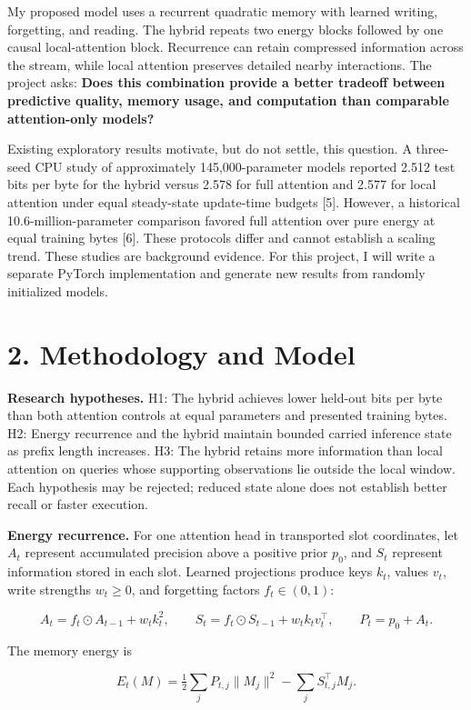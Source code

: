 \documentclass[11pt,letterpaper]{article}
\begin{document}
My proposed model uses a recurrent quadratic memory with learned writing, forgetting, and reading. The hybrid repeats two energy blocks followed by one causal local-attention block. Recurrence can retain compressed information across the stream, while local attention preserves detailed nearby interactions. The project asks: \textbf{Does this combination provide a better tradeoff between predictive quality, memory usage, and computation than comparable attention-only models?}

Existing exploratory results motivate, but do not settle, this question. A three-seed CPU study of approximately 145,000-parameter models reported 2.512 test bits per byte for the hybrid versus 2.578 for full attention and 2.577 for local attention under equal steady-state update-time budgets [5]. However, a historical 10.6-million-parameter comparison favored full attention over pure energy at equal training bytes [6]. These protocols differ and cannot establish a scaling trend. These studies are background evidence. For this project, I will write a separate PyTorch implementation and generate new results from randomly initialized models.

\newpage
\section*{2. Methodology and Model}

\textbf{Research hypotheses.} H1: The hybrid achieves lower held-out bits per byte than both attention controls at equal parameters and presented training bytes. H2: Energy recurrence and the hybrid maintain bounded carried inference state as prefix length increases. H3: The hybrid retains more information than local attention on queries whose supporting observations lie outside the local window. Each hypothesis may be rejected; reduced state alone does not establish better recall or faster execution.

\textbf{Energy recurrence.} For one attention head in transported slot coordinates, let \(A_t\) represent accumulated precision above a positive prior \(p_0\), and \(S_t\) represent information stored in each slot. Learned projections produce keys \(k_t\), values \(v_t\), write strengths \(w_t\geq0\), and forgetting factors \(f_t\in(0,1)\):

\[
A_t=f_t\odot A_{t-1}+w_t k_t^2,\qquad
S_t=f_t\odot S_{t-1}+w_t k_t v_t^\top,\qquad
P_t=p_0+A_t.
\]

The memory energy is

\[
E_t(M)=\tfrac12\sum_j P_{t,j}\|M_j\|^2-\sum_j S_{t,j}^{\top}M_j.
\]
\end{document}
